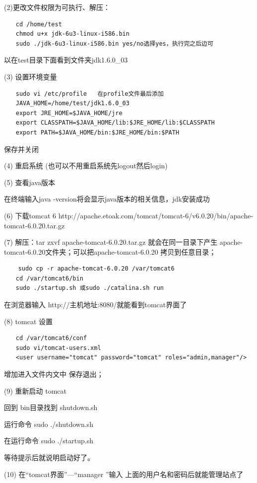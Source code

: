 (2)更改文件权限为可执行、解压：
\begin{verbatim}
　　cd /home/test
　　chmod u+x jdk-6u3-linux-i586.bin
　　sudo ./jdk-6u3-linux-i586.bin yes/no选择yes，执行完之后边可
\end{verbatim}

以在test目录下面看到文件夹jdk1.6.0\_03

(3) 设置环境变量
\begin{verbatim}
　　sudo vi /etc/profile   在profile文件最后添加
　　JAVA_HOME=/home/test/jdk1.6.0_03
　　export JRE_HOME=$JAVA_HOME/jre
　　export CLASSPATH=$JAVA_HOME/lib:$JRE_HOME/lib:$CLASSPATH
　　export PATH=$JAVA_HOME/bin:$JRE_HOME/bin:$PATH
\end{verbatim}

保存并关闭

(4) 重启系统 (也可以不用重启系统先logout然后login)

(5) 查看java版本

在终端输入java -version将会显示java版本的相关信息，jdk安装成功

(6) 下载tomcat 6 http://apache.etoak.com/tomcat/tomcat-6/v6.0.20/bin/apache-tomcat-6.0.20.tar.gz

(7) 解压：tar zxvf apache-tomcat-6.0.20.tar.gz 就会在同一目录下产生 apache-tomcat-6.0.20文件夹；可以把apache-tomcat-6.0.20 拷贝到任意目录；

\begin{verbatim}
    sudo cp -r apache-tomcat-6.0.20 /var/tomcat6
　　cd /var/tomcat6/bin
　　sudo ./startup.sh 或sudo ./catalina.sh run
\end{verbatim}

在浏览器输入 http://主机地址:8080/就能看到tomcat界面了

(8) tomcat 设置
\begin{verbatim}
　　cd /var/tomcat6/conf
　　sudo vi/tomcat-users.xml
　　<user username="tomcat" password="tomcat" roles="admin,manager"/>
\end{verbatim}

增加进入文件内文中 保存退出；

(9) 重新启动 tomcat

回到 bin目录找到 shutdown.sh

运行命令 sudo ./shutdown.sh

在运行命令 sudo ./startup.sh

等待提示后就说明启动好了。

(10) 在“tomcat界面”---“manager ”输入 上面的用户名和密码后就能管理站点了

